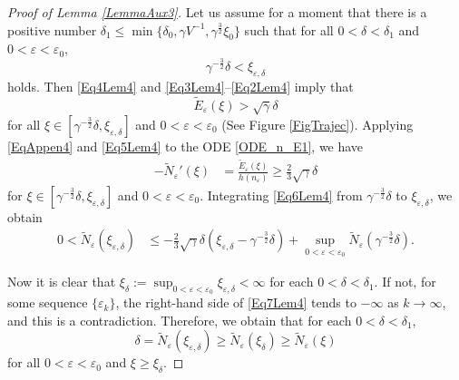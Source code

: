 \documentclass{amsart}
\newcommand{\veps}{\varepsilon}
\numberwithin{equation}{section}
\theoremstyle{plain}%
\theoremstyle{definition}
\theoremstyle{remark}
\theoremstyle{remark}
\begin{document}
\begin{proof}[Proof of Lemma \ref{LemmaAux3}]
Let us assume for a moment that there is a positive number $\delta_1 \leq \min\{\delta_0,\gamma V^{-1},\gamma^{\frac{3}{2}}\xi_0\}$ such that for all $0<\delta < \delta_1$ and $0<\veps<\veps_0$, 
\begin{equation}\label{Eq2Lem4}
\gamma^{-\frac{3}{2}}\delta < \xi_{\veps,\delta}
\end{equation}
holds. Then \eqref{Eq4Lem4} and \eqref{Eq3Lem4}--\eqref{Eq2Lem4} imply that
\begin{equation}\label{Eq5Lem4}
\widetilde{E}_\veps(\xi)>\sqrt{\gamma}\delta
\end{equation}
for all $\xi\in[\gamma^{-\frac{3}{2}}\delta, \xi_{\veps,\delta}]$ and $0<\veps<\veps_0$ (See Figure \ref{FigTrajec}).
 Applying \eqref{EqAppen4} and \eqref{Eq5Lem4} to the ODE \eqref{ODE_n_E1}, we have 
\begin{equation}\label{Eq6Lem4}
\begin{split}
-\widetilde{N}_\veps'(\xi) 
& = \frac{\widetilde{E}_\veps(\xi)}{h(n_\veps)}  \geq  \frac{2}{3}\sqrt{\gamma}\delta
\end{split}
\end{equation}
for $\xi\in[\gamma^{-\frac{3}{2}}\delta, \xi_{\veps,\delta}]$ and $0<\veps<\veps_0$. Integrating \eqref{Eq6Lem4} from $\gamma^{-\frac{3}{2}}\delta$ to $\xi_{\veps,\delta}$, we obtain
\begin{equation}\label{Eq7Lem4}
\begin{split}
0<\widetilde{N}_\veps(\xi_{\veps,\delta})
& \leq - \frac{2}{3}\sqrt{\gamma}\delta(\xi_{\veps,\delta}- \gamma^{-\frac{3}{2}}\delta) + \sup_{0<\veps<\veps_0}\widetilde{N}_\veps(\gamma^{-\frac{3}{2}}\delta).
\end{split}
\end{equation}

Now it is clear that $\xi_{\delta}:=\sup_{0<\veps<\veps_0}\xi_{\veps,\delta}<\infty$ for each $0<\delta<\delta_1$. If not, for some sequence $\{\veps_k\}$, the right-hand side of \eqref{Eq7Lem4} tends to $-\infty$ as $k \to \infty$, and this is a contradiction. Therefore, we obtain that for each $0<\delta<\delta_1$,
\[
\delta =\widetilde{N}_\veps(\xi_{\veps,\delta}) \geq   \widetilde{N}_\veps(\xi_\delta) \geq \widetilde{N}_\veps(\xi)
\]
for all $0<\veps<\veps_0$ and $\xi \geq \xi_\delta$.


\end{proof}
\end{document}
